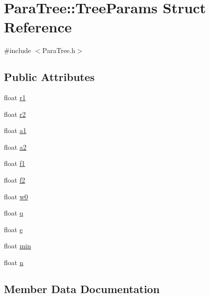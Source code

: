 \hypertarget{struct_para_tree_1_1_tree_params}{}\section{Para\+Tree\+:\+:Tree\+Params Struct Reference}
\label{struct_para_tree_1_1_tree_params}


{\ttfamily \#include $<$Para\+Tree.\+h$>$}

\subsection*{Public Attributes}
\begin{DoxyCompactItemize}
\item 
float \hyperlink{struct_para_tree_1_1_tree_params_acdf6e36e58426bdb1289ebf2ab75502c}{r1}
\item 
float \hyperlink{struct_para_tree_1_1_tree_params_a87de942877435a9303395f43f7b55a91}{r2}
\item 
float \hyperlink{struct_para_tree_1_1_tree_params_ad7a978be36de75dd6faad5a25d6d47be}{a1}
\item 
float \hyperlink{struct_para_tree_1_1_tree_params_a4d3a22d7a87af7ae0191f2ec0970ad31}{a2}
\item 
float \hyperlink{struct_para_tree_1_1_tree_params_ada2709a5ff4b4dad887bf7522918e64a}{f1}
\item 
float \hyperlink{struct_para_tree_1_1_tree_params_aec341bcee27495140b7e05361626e9d8}{f2}
\item 
float \hyperlink{struct_para_tree_1_1_tree_params_acd7a09e825d636bcf13adf7259599cf3}{w0}
\item 
float \hyperlink{struct_para_tree_1_1_tree_params_a0ba9a10e66947fea4ad604701e16ba76}{q}
\item 
float \hyperlink{struct_para_tree_1_1_tree_params_ac10ef6a95bffabef0460ac27c478a67e}{e}
\item 
float \hyperlink{struct_para_tree_1_1_tree_params_a6e8de51864c4de420d6472a7107f2ee8}{min}
\item 
float \hyperlink{struct_para_tree_1_1_tree_params_a2d7f1c1e4b6163af7319cccd6615863f}{n}
\end{DoxyCompactItemize}


\subsection{Member Data Documentation}
